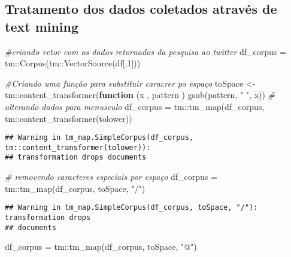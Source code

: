 \documentclass[
]{article}
\newenvironment{Shaded}{\begin{snugshade}}{\end{snugshade}}
\newcommand{\CommentTok}[1]{\textcolor[rgb]{0.56,0.35,0.01}{\textit{#1}}}
\newcommand{\ControlFlowTok}[1]{\textcolor[rgb]{0.13,0.29,0.53}{\textbf{#1}}}
\newcommand{\DecValTok}[1]{\textcolor[rgb]{0.00,0.00,0.81}{#1}}
\newcommand{\FunctionTok}[1]{\textcolor[rgb]{0.00,0.00,0.00}{#1}}
\newcommand{\NormalTok}[1]{#1}
\newcommand{\OtherTok}[1]{\textcolor[rgb]{0.56,0.35,0.01}{#1}}
\newcommand{\SpecialCharTok}[1]{\textcolor[rgb]{0.00,0.00,0.00}{#1}}
\newcommand{\StringTok}[1]{\textcolor[rgb]{0.31,0.60,0.02}{#1}}
\begin{document}
\hypertarget{tratamento-dos-dados-coletados-atravuxe9s-de-text-mining}{%
\subsection{Tratamento dos dados coletados através de text
mining}\label{tratamento-dos-dados-coletados-atravuxe9s-de-text-mining}}

\begin{Shaded}
\begin{Highlighting}[]
\CommentTok{\#criando vetor com os dados retornados da pesquisa ao twitter}
\NormalTok{df\_corpus }\OtherTok{=}\NormalTok{ tm}\SpecialCharTok{::}\FunctionTok{Corpus}\NormalTok{(tm}\SpecialCharTok{::}\FunctionTok{VectorSource}\NormalTok{(df[,}\DecValTok{1}\NormalTok{]))}

\CommentTok{\#Criando uma função para substituir caracrer po espaço}
\NormalTok{toSpace }\OtherTok{\textless{}{-}}\NormalTok{ tm}\SpecialCharTok{::}\FunctionTok{content\_transformer}\NormalTok{(}\ControlFlowTok{function}\NormalTok{ (x , pattern ) }\FunctionTok{gsub}\NormalTok{(pattern, }\StringTok{" "}\NormalTok{, x))}
\CommentTok{\# alterando dados para menusculo}
\NormalTok{df\_corpus }\OtherTok{=}\NormalTok{ tm}\SpecialCharTok{::}\FunctionTok{tm\_map}\NormalTok{(df\_corpus, tm}\SpecialCharTok{::}\FunctionTok{content\_transformer}\NormalTok{(tolower))}
\end{Highlighting}
\end{Shaded}

\begin{verbatim}
## Warning in tm_map.SimpleCorpus(df_corpus, tm::content_transformer(tolower)):
## transformation drops documents
\end{verbatim}

\begin{Shaded}
\begin{Highlighting}[]
\CommentTok{\# removendo caracteres especiais por espaço}
\NormalTok{df\_corpus }\OtherTok{=}\NormalTok{ tm}\SpecialCharTok{::}\FunctionTok{tm\_map}\NormalTok{(df\_corpus, toSpace, }\StringTok{"/"}\NormalTok{)}
\end{Highlighting}
\end{Shaded}

\begin{verbatim}
## Warning in tm_map.SimpleCorpus(df_corpus, toSpace, "/"): transformation drops
## documents
\end{verbatim}

\begin{Shaded}
\begin{Highlighting}[]
\NormalTok{df\_corpus }\OtherTok{=}\NormalTok{ tm}\SpecialCharTok{::}\FunctionTok{tm\_map}\NormalTok{(df\_corpus, toSpace, }\StringTok{"@"}\NormalTok{)}
\end{Highlighting}
\end{Shaded}
\end{document}
